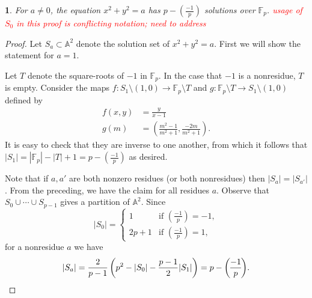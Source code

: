 \documentclass[10pt,a4paper]{amsart}
\numberwithin{equation}{section}
\numberwithin{figure}{section}
\theoremstyle{definition}
\theoremstyle{remark}
\theoremstyle{plain}
\theoremstyle{plain}
\theoremstyle{definition}
\theoremstyle{plain}
\newtheorem{prop}{\protect\propositionname}[section]
\theoremstyle{plain}
\providecommand{\propositionname}{Proposition}
\newcommand{\legendre}[2]{\genfrac{(}{)}{}{}{#1}{#2}}
\begin{document}
\begin{prop}\label{prop:circle-solutions}
	For $a \neq 0$, the equation $x^2 + y^2 = a$ has $p - \legendre{-1}{p}$ solutions over $\mathbb{F}_p$. \textcolor{red}{usage of $S_0$ in this proof is conflicting notation; need to address}
\end{prop}
\begin{proof}
	Let $S_a \subset \mathbb{A}^2$ denote the solution set of $x^2 + y^2 = a$. First we will show the statement for $a=1$.
	
	Let $T$ denote the square-roots of $-1$ in $\mathbb{F}_p$. In the case that $-1$ is a nonresidue, $T$ is empty. Consider the maps $f\colon S_1 \setminus (1,0) \to \mathbb{F}_p \setminus T$ and $g\colon \mathbb{F}_p \setminus T \to S_1 \setminus (1,0)$ defined by
	\begin{align*}
	f(x,y) &= \frac{y}{x-1}\\
	g(m) &= \left(\frac{m^2 - 1}{m^2 + 1}, \frac{-2m}{m^2 + 1}\right).
	\end{align*}
	It is easy to check that they are inverse to one another, from which it follows that $|S_1| = |\mathbb{F}_p| - |T| + 1 = p - \legendre{-1}{p}$ as desired.
	
	Note that if $a,a'$ are both nonzero residues (or both nonresidues) then $|S_a| = |S_{a'}|$. From the preceding, we have the claim for all residues $a$. Observe that $S_0 \cup \cdots \cup S_{p-1}$ gives a partition of $\mathbb{A}^2$. Since
	\[
	|S_0| = \left\{\begin{matrix}
	1 & \text{if }\legendre{-1}{p} = -1,\\
	2p+1 & \text{if }\legendre{-1}{p} = 1,
	\end{matrix}\right.
	\]
	for a nonresidue $a$ we have
	\[
	|S_a| = \frac{2}{p-1} \left(p^2 - |S_0| - \frac{p-1}{2}|S_1|\right) = p - \legendre{-1}{p}.\qedhere
	\]
\end{proof}
\end{document}

